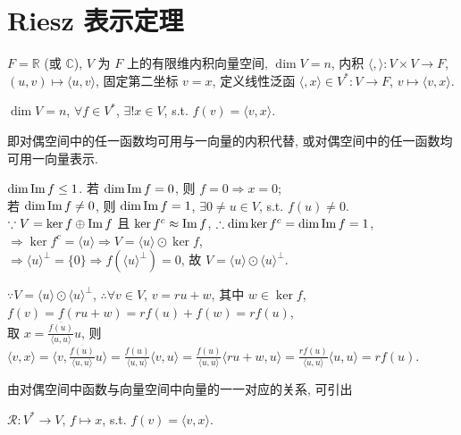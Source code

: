 \documentclass{note}
\begin{document}
\section{Riesz 表示定理}
$F=\mathbb{R}$ (或 $\mathbb{C}$), $V$ 为 $F$ 上的有限维内积向量空间, $\dim V=n$, 内积 $\langle,\rangle:V\times V\rightarrow F$, $(u,v)\mapsto\langle u,v\rangle$, 固定第二坐标 $v=x$, 定义线性泛函 $\langle,x\rangle\in V^*:V\rightarrow F$, $v\mapsto\langle v,x\rangle$.
\begin{thm}\label{thm-9.15}
    $\dim V=n$, $\forall f\in V^*$, $\exists!x\in V$, s.t. $f(v)=\langle v,x\rangle$.
\end{thm}
即对偶空间中的任一函数均可用与一向量的内积代替, 或对偶空间中的任一函数均可用一向量表示.
\begin{pf}
    $\dim\operatorname{Im} f\leq 1$. 若 $\dim\operatorname{Im} f=0$, 则 $f=0\Longrightarrow x=0$;\\
    若 $\dim\operatorname{Im} f\neq 0$, 则 $\dim\operatorname{Im} f=1$, $\exists 0\neq u\in V$, s.t. $f(u)\neq 0$.\\
    $\because V=\ker f\oplus\operatorname{Im} f$ 且 $\ker f^c\approx\operatorname{Im} f$, $\therefore\dim\ker f^c=\dim\operatorname{Im} f=1$,\\
    $\Longrightarrow\ker f^c=\langle u\rangle\Longrightarrow V=\langle u\rangle\odot\ker f$,\\
    $\Longrightarrow\langle u\rangle^{\perp}=\{0\}\Longrightarrow f(\langle u\rangle^{\perp})=0$, 故 $V=\langle u\rangle\odot\langle u\rangle^{\perp}$.

    $\because V=\langle u\rangle\odot\langle u\rangle^{\perp}$, $\therefore\forall v\in V$, $v=ru+w$, 其中 $w\in\ker f$, $f(v)=f(ru+w)=rf(u)+f(w)=rf(u)$,\\
    取 $x=\frac{\overline{f(u)}}{\langle u,u\rangle}u$, 则 $\langle v,x\rangle=\langle v,\frac{\overline{f(u)}}{\langle u,u\rangle}u\rangle=\frac{f(u)}{\langle u,u\rangle}\langle v,u\rangle=\frac{f(u)}{\langle u,u\rangle}\langle ru+w,u\rangle=\frac{rf(u)}{\langle u,u\rangle}\langle u,u\rangle=rf(u)$.
\end{pf}

由对偶空间中函数与向量空间中向量的一一对应的关系, 可引出
\begin{df}[Riesz 映射]
    $\mathcal{R}:V^*\rightarrow V$, $f\mapsto x$, s.t. $f(v)=\langle v,x\rangle$.
\end{df}
\end{document}

